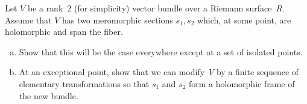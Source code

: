 \documentclass[12pt]{article}
\begin{document}
\begin{exercise}

Let $V$ be a rank~2 (for simplicity) vector bundle over a Riemann surface~$R$. 
Assume that $V$ has two meromorphic sections $s_1, s_2$ which, at some point, 
are holomorphic and span the fiber.

\begin{enumerate}[(a)]
    \item Show that this will be the case everywhere except at a set of isolated points.
    \item At an exceptional point, show that we can modify~$V$ by a finite sequence 
    of elementary transformations so that $s_1$ and $s_2$ form a holomorphic frame 
    of the new bundle.
\end{enumerate}
\end{exercise}
\end{document}
